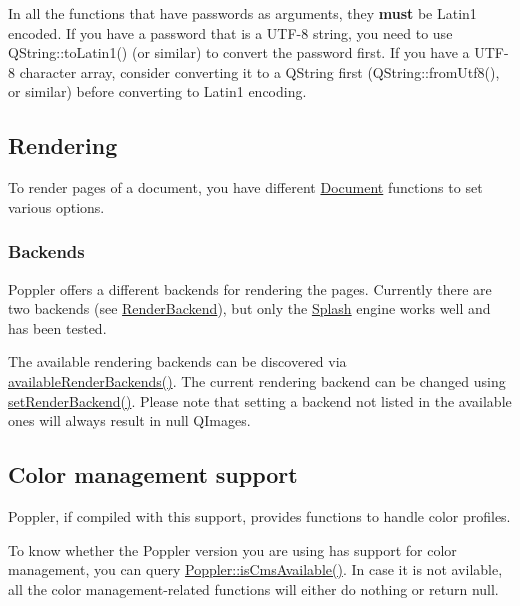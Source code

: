 In all the functions that have passwords as arguments, they {\bfseries must} be Latin1 encoded. If you have a password that is a U\+T\+F-\/8 string, you need to use Q\+String\+::to\+Latin1() (or similar) to convert the password first. If you have a U\+T\+F-\/8 character array, consider converting it to a Q\+String first (Q\+String\+::from\+Utf8(), or similar) before converting to Latin1 encoding.\hypertarget{class_poppler_1_1_document_document-rendering}{}\subsection{Rendering}\label{class_poppler_1_1_document_document-rendering}
To render pages of a document, you have different \hyperlink{class_poppler_1_1_document}{Document} functions to set various options.\hypertarget{class_poppler_1_1_document_document-rendering-backend}{}\subsubsection{Backends}\label{class_poppler_1_1_document_document-rendering-backend}
Poppler offers a different backends for rendering the pages. Currently there are two backends (see \hyperlink{class_poppler_1_1_document_a4b0a8ab6b6f686c8802a0ad112d48247}{Render\+Backend}), but only the \hyperlink{class_splash}{Splash} engine works well and has been tested.

The available rendering backends can be discovered via \hyperlink{class_poppler_1_1_document_a3a664ff0948be89cd7ef2585f9e56659}{available\+Render\+Backends()}. The current rendering backend can be changed using \hyperlink{class_poppler_1_1_document_a81a758f83530fa1cfaddf748c6be89c9}{set\+Render\+Backend()}. Please note that setting a backend not listed in the available ones will always result in null Q\+Image\textquotesingle{}s.\hypertarget{class_poppler_1_1_document_document-cms}{}\subsection{Color management support}\label{class_poppler_1_1_document_document-cms}
Poppler, if compiled with this support, provides functions to handle color profiles.

To know whether the Poppler version you are using has support for color management, you can query \hyperlink{namespace_poppler_a21ef0e2c0c9cfed4548570f8d9c47879}{Poppler\+::is\+Cms\+Available()}. In case it is not avilable, all the color management-\/related functions will either do nothing or return null. 

